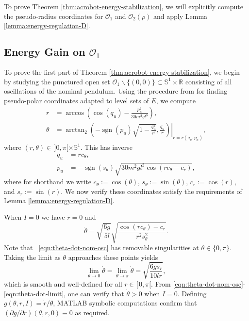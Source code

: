 \documentclass[journal,twoside,web, onecolumn, draftcls]{ieeecolor}
\DeclareMathOperator{\Sign}{sgn}
\newcommand*{\sign}[1]{\Sign\left(#1\right)}
\newcommand*{\R}{\mathbb{R}}
\newcommand*{\Sone}{\mathbb{S}^1}
\newcommand*{\SxR}{\Sone \times \R}
\begin{document}
To prove Theorem \ref{thm:acrobot-energy-stabilization}, we will explicitly
compute the pseudo-radius coordinates for \(\mathcal{O}_1\) and
\(\mathcal{O}_2(\rho)\) and apply Lemma \ref{lemma:energy-regulation-D}.
 

\subsection{Energy Gain on \(\mathcal{O}_1\)}\label{sec:proof-o1}
To prove the first part of Theorem
\ref{thm:acrobot-energy-stabilization},
we begin by studying the punctured open set
\(\mathcal{O}_1 \backslash \{(0,0)\} \subset \SxR\) consisting of all
oscillations of the nominal pendulum.
Using the procedure from \cite{dynamic_vhcs_stabilize_closed_orbits} for finding
pseudo-polar coordinates adapted to level sets of \(E\), we compute
\begin{align}
    \label{eqn:r-osc}
    r &= \arccos\left(\cos(q_u) - \frac{p_u^2}{30m^2gl^3}\right)
    , \\
    \label{eqn:theta-osc}
    \theta &=
    \left.\arctan_2\left(-\sign{p_u}\sqrt{1-\frac{q_u^2}{r^2}},\frac{q_u}{r}\right)
    \right|_{r = r(q_u,p_u)}
    ,
\end{align}
where \((r,\theta) \in \, ]0,\pi[ \times \Sone\).
This has inverse
\begin{align*}
    q_u &= rc_\theta
    , \\
    p_u &= -\sign{s_\theta}
    \sqrt{30m^2gl^3\cos(rc_\theta - c_r)}
    ,
\end{align*}
where for shorthand we write \(c_\theta := \cos(\theta)\), \(s_\theta :=
\sin(\theta)\), \(c_r := \cos(r)\), and \(s_r := \sin(r)\).
We now verify these coordinates satisfy the requirements of 
Lemma \ref{lemma:energy-regulation-D}.

When \(I = 0\) we have \(\dot{r} = 0\) and
\begin{equation} \label{eqn:theta-dot-nom-osc}
    \dot{\theta} = \sqrt{\frac{6g}{5l}} 
        \sqrt{\frac{\cos(r c_\theta) - c_r}
            {r^2 s_\theta^2}}
    .
\end{equation}
Note that ~\eqref{eqn:theta-dot-nom-osc} has removable singularities at
\(\theta \in \{0,\pi\}\).
Taking the limit as \(\theta\) approaches these points yields
\begin{equation}\label{eqn:theta-dot-limit}
    \lim\limits_{\theta \to 0}\dot{\theta} 
    = \lim\limits_{\theta \to \pi} \dot{\theta}
    = \sqrt{\frac{6g s_r}{10lr}}
    , 
\end{equation}
which is smooth and well-defined for all
\(r \in \, ]0,\pi[\).
From \eqref{eqn:theta-dot-nom-osc}-\eqref{eqn:theta-dot-limit},
one can verify that \(\dot{\theta} > 0\) when \(I = 0\).
Defining \(g(\theta,r,I) = \dot{r}/\dot{\theta}\), MATLAB symbolic computations
confirm that \((\partial g/\partial r)(\theta,r,0) \equiv 0\) as required.
\end{document}
